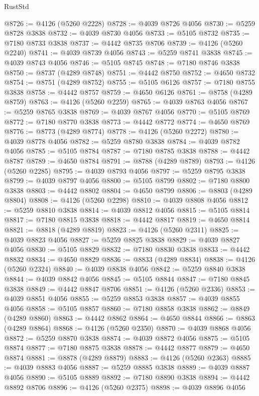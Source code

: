 \begin{lexlean}{RustStd}
\begin{coremodule}
@8726 := @4126 (@5260 @2228)
@8728 := @4039 @8726 @4056
@8730 := @5259 @8728 @3838
@8732 := @4039 @8730 @4056
@8733 := @5105 @8732
@8735 := @7180 @8733 @3838
@8737 := @4442 @8735 @8706
@8739 := @4126 (@5260 @2240)
@8741 := @4039 @8739 @4056
@8743 := @5259 @8741 @3838
@8745 := @4039 @8743 @4056
@8746 := @5105 @8745
@8748 := @7180 @8746 @3838
@8750 := @8737 (@4289 @8748)
@8751 := @4442 @8750
@8752 := @4650 @8732
@8754 := @8751 (@4289 @8752)
@8755 := @5105 @6126
@8757 := @7180 @8755 @3838
@8758 := @4442 @8757
@8759 := @4650 @6126
@8761 := @8758 (@4289 @8759)
@8763 := @4126 (@5260 @2259)
@8765 := @4039 @8763 @4056
@8767 := @5259 @8765 @3838
@8769 := @4039 @8767 @4056
@8770 := @5105 @8769
@8772 := @7180 @8770 @3838
@8773 := @4442 @8772
@8774 := @4650 @8769
@8776 := @8773 (@4289 @8774)
@8778 := @4126 (@5260 @2272)
@8780 := @4039 @8778 @4056
@8782 := @5259 @8780 @3838
@8784 := @4039 @8782 @4056
@8785 := @5105 @8784
@8787 := @7180 @8785 @3838
@8788 := @4442 @8787
@8789 := @4650 @8784
@8791 := @8788 (@4289 @8789)
@8793 := @4126 (@5260 @2285)
@8795 := @4039 @8793 @4056
@8797 := @5259 @8795 @3838
@8799 := @4039 @8797 @4056
@8800 := @5105 @8799
@8802 := @7180 @8800 @3838
@8803 := @4442 @8802
@8804 := @4650 @8799
@8806 := @8803 (@4289 @8804)
@8808 := @4126 (@5260 @2298)
@8810 := @4039 @8808 @4056
@8812 := @5259 @8810 @3838
@8814 := @4039 @8812 @4056
@8815 := @5105 @8814
@8817 := @7180 @8815 @3838
@8818 := @4442 @8817
@8819 := @4650 @8814
@8821 := @8818 (@4289 @8819)
@8823 := @4126 (@5260 @2311)
@8825 := @4039 @8823 @4056
@8827 := @5259 @8825 @3838
@8829 := @4039 @8827 @4056
@8830 := @5105 @8829
@8832 := @7180 @8830 @3838
@8833 := @4442 @8832
@8834 := @4650 @8829
@8836 := @8833 (@4289 @8834)
@8838 := @4126 (@5260 @2324)
@8840 := @4039 @8838 @4056
@8842 := @5259 @8840 @3838
@8844 := @4039 @8842 @4056
@8845 := @5105 @8844
@8847 := @7180 @8845 @3838
@8849 := @4442 @8847 @8706
@8851 := @4126 (@5260 @2336)
@8853 := @4039 @8851 @4056
@8855 := @5259 @8853 @3838
@8857 := @4039 @8855 @4056
@8858 := @5105 @8857
@8860 := @7180 @8858 @3838
@8862 := @8849 (@4289 @8860)
@8863 := @4442 @8862
@8864 := @4650 @8844
@8866 := @8863 (@4289 @8864)
@8868 := @4126 (@5260 @2350)
@8870 := @4039 @8868 @4056
@8872 := @5259 @8870 @3838
@8874 := @4039 @8872 @4056
@8875 := @5105 @8874
@8877 := @7180 @8875 @3838
@8878 := @4442 @8877
@8879 := @4650 @8874
@8881 := @8878 (@4289 @8879)
@8883 := @4126 (@5260 @2363)
@8885 := @4039 @8883 @4056
@8887 := @5259 @8885 @3838
@8889 := @4039 @8887 @4056
@8890 := @5105 @8889
@8892 := @7180 @8890 @3838
@8894 := @4442 @8892 @8706
@8896 := @4126 (@5260 @2375)
@8898 := @4039 @8896 @4056

\end{coremodule}
\end{lexlean}
